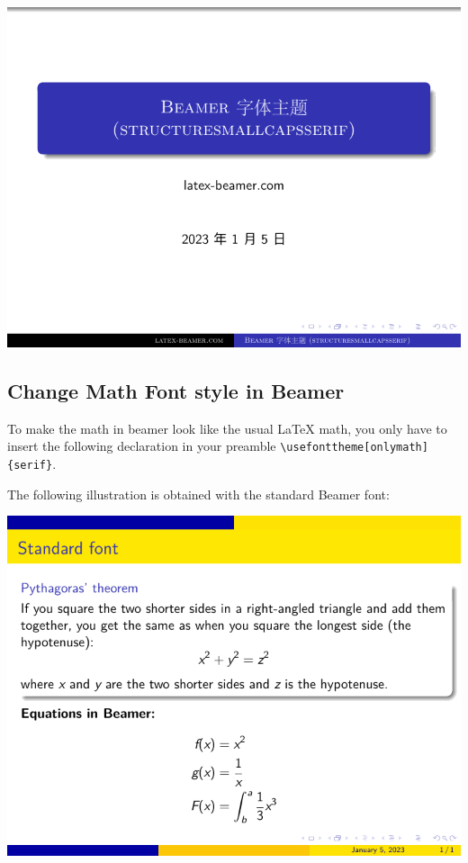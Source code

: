 \includegraphics[page=2]{examples/beamer/font-theme-structuresmallcapsserif.pdf}

\subsection{Change Math Font style in Beamer}

To make the math in beamer look like the usual {\LaTeX} math, you only have to insert the following declaration in your preamble \verb|\usefonttheme[onlymath]{serif}|.

The following illustration is obtained with the standard Beamer font:

\includegraphics{examples/beamer/font-theme-change-math-font-style1.pdf}

